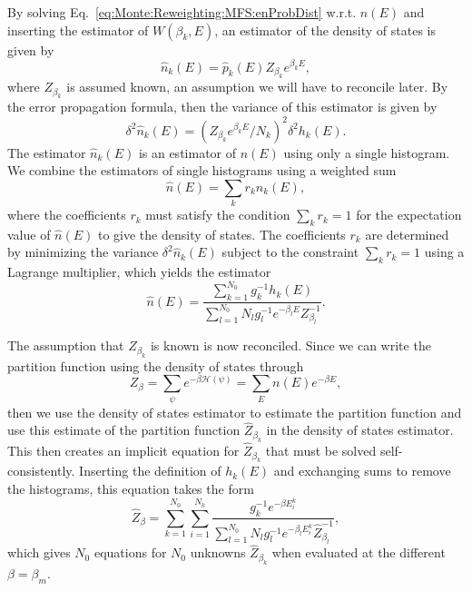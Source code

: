 By solving Eq.~\eqref{eq:Monte:Reweighting:MFS:enProbDist} w.r.t. $n(E)$ and inserting the estimator of $W(\beta_k,E)$, an estimator of the density of states is given by
\begin{equation}
    \label{eq:Monte:Reweighting:MFS:DOSEstimator}
    \hat{n}_k(E) = \hat{p}_k(E)Z_{\beta_k}e^{\beta_kE},
\end{equation}
where $Z_{\beta_k}$ is assumed known, an assumption we will have to reconcile later. By the error propagation formula, then the variance of this estimator is given by
\begin{equation}
    \label{eq:Monte:Reweighting:MFS:DOSVariance}
    \delta^2\hat{n}_k(E) = (Z_{\beta_k}e^{\beta_kE}/N_k)^2\delta^2h_k(E).
\end{equation}
The estimator $\hat{n}_k(E)$ is an estimator of $n(E)$ using only a single histogram. We combine the estimators of single histograms using a weighted sum
\begin{equation}
    \label{eq:Monte:Reweighting:MFS:DOSWeightedEstimator}
    \hat{n}(E) = \sum_kr_k\hat{n}_k(E),
\end{equation}
where the coefficients $r_k$ must satisfy the condition $\sum_kr_k = 1$ for the expectation value of $\hat{n}(E)$ to give the density of states. The coefficients
$r_k$ are determined by minimizing the variance $\delta^2\hat{n}_k(E)$ subject to the constraint $\sum_kr_k=1$ using a Lagrange multiplier, which yields the estimator
\begin{equation}
    \label{eq:Monte:Reweighting:MFS:minimizedDOSWeightedEstimator}
    \hat{n}(E) = \frac{\sum_{k=1}^{N_0}g_k^{-1}h_k(E)}{\sum_{l=1}^{N_0}N_lg_l^{-1}e^{-\beta_lE}Z_{\beta_l}^{-1}}.
\end{equation}

The assumption that $Z_{\beta_k}$ is known is now reconciled. Since we can write the partition function using the density of states through
\begin{equation}
    \label{eq:Monte:Reweighting:MFS:partitionFunctionDOS}
    Z_\beta = \sum_\psi e^{-\beta\mathcal{H}(\psi)} = \sum_En(E)e^{-\beta E},
\end{equation}
then we use the density of states estimator to estimate the partition function and use this estimate of the partition function $\hat{Z}_{\beta_k}$ in the density
of states estimator. This then creates an implicit equation for $\hat{Z}_{\beta_k}$ that must be solved self-consistently. Inserting the definition of $h_k(E)$
and exchanging sums to remove the histograms, this equation takes the form
\begin{equation}
    \label{eq:Monte:Reweighting:MFS:selfConsistencyEq}
    \hat{Z}_{\beta} = \sum_{k=1}^{N_0}\sum_{i=1}^{N_k}\frac{g_k^{-1}e^{-\beta E_i^k}}{\sum_{l=1}^{N_0}N_lg_l^{-1}e^{-\beta_lE_i^k}\hat{Z}_{\beta_l}^{-1}},
\end{equation}
which gives $N_0$ equations for $N_0$ unknowns $\hat{Z}_{\beta_k}$ when evaluated at the different $\beta=\beta_m$.

